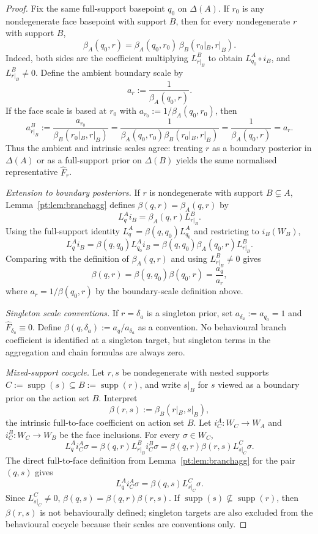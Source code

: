 \documentclass[11pt,a4paper]{article}
\theoremstyle{definition}
\newcommand{\1}{\mathbf 1}
\begin{document}
\begin{proof}
Fix the same full-support basepoint $q_0$ on $\Delta(A)$.  If $r_0$ is any nondegenerate face basepoint with support $B$,
then for every nondegenerate $r$ with support $B$,
\[
\beta_A(q_0,r)=\beta_A(q_0,r_0)\,\beta_B(r_0|_B,r|_B).
\]
Indeed, both sides are the coefficient multiplying $L_{r|_B}^B$ to obtain $L_{q_0}^A\circ i_B$, and
$L_{r|_B}^B\ne0$.  Define the ambient boundary scale by
\[
a_r:=\frac{1}{\beta_A(q_0,r)}.
\]
If the face scale is based at $r_0$ with $a_{r_0}:=1/\beta_A(q_0,r_0)$, then
\[
a_{r|_B}^B:=\frac{a_{r_0}}{\beta_B(r_0|_B,r|_B)}
=\frac{1}{\beta_A(q_0,r_0)\beta_B(r_0|_B,r|_B)}
=\frac{1}{\beta_A(q_0,r)}
=a_r.
\]
Thus the ambient and intrinsic scales agree: treating $r$ as a boundary posterior in $\Delta(A)$ or as a full-support prior
on $\Delta(B)$ yields the same normalised representative $\widehat F_r$.

\emph{Extension to boundary posteriors.}  If $r$ is nondegenerate with support $B\subsetneq A$, Lemma~\ref{pt:lem:branchagg}
defines
$\beta(q,r)=\beta_A(q,r)$ by
\[
L_q^A i_B=\beta_A(q,r)L_{r|_B}^B.
\]
Using the full-support identity $L_q^A=\beta(q,q_0)L_{q_0}^A$ and restricting to $i_B(W_B)$,
\[
L_q^A i_B=\beta(q,q_0)L_{q_0}^A i_B
=\beta(q,q_0)\beta_A(q_0,r)L_{r|_B}^B.
\]
Comparing with the definition of $\beta_A(q,r)$ and using $L_{r|_B}^B\ne0$ gives
\[
\beta(q,r)=\beta(q,q_0)\beta(q_0,r)=\frac{a_q}{a_r},
\]
where $a_r=1/\beta(q_0,r)$ by the boundary-scale definition above.

\emph{Singleton scale conventions.}  If $r=\delta_a$ is a singleton prior, set $a_{\delta_a}:=a_{q_0}=1$ and
$\widehat F_{\delta_a}\equiv0$.  Define $\beta(q,\delta_a):=a_q/a_{\delta_a}$ as a convention.  No behavioural branch
coefficient is identified at a singleton target, but singleton terms in the aggregation and chain formulas are always zero.

\emph{Mixed-support cocycle.}  Let $r,s$ be nondegenerate with nested supports
$C:=\operatorname{supp}(s)\subseteq B:=\operatorname{supp}(r)$, and write $s|_B$ for $s$ viewed as a boundary prior on
the action set $B$.  Interpret
\[
\beta(r,s):=\beta_B(r|_B,s|_B),
\]
the intrinsic full-to-face coefficient on action set $B$.  Let $i_C^A:W_C\to W_A$ and $i_C^B:W_C\to W_B$ be the face
inclusions.  For every $\sigma\in W_C$,
\[
L_q^A i_C^A\sigma
=\beta(q,r)L_{r|_B}^B i_C^B\sigma
=\beta(q,r)\beta(r,s)L_{s|_C}^C\sigma.
\]
The direct full-to-face definition from Lemma~\ref{pt:lem:branchagg} for the pair $(q,s)$ gives
\[
L_q^A i_C^A\sigma=\beta(q,s)L_{s|_C}^C\sigma.
\]
Since $L_{s|_C}^C\ne0$, $\beta(q,s)=\beta(q,r)\beta(r,s)$.  If
$\operatorname{supp}(s)\not\subseteq\operatorname{supp}(r)$, then $\beta(r,s)$ is not behaviourally defined; singleton
targets are also excluded from the behavioural cocycle because their scales are conventions only.


\end{proof}
\end{document}
